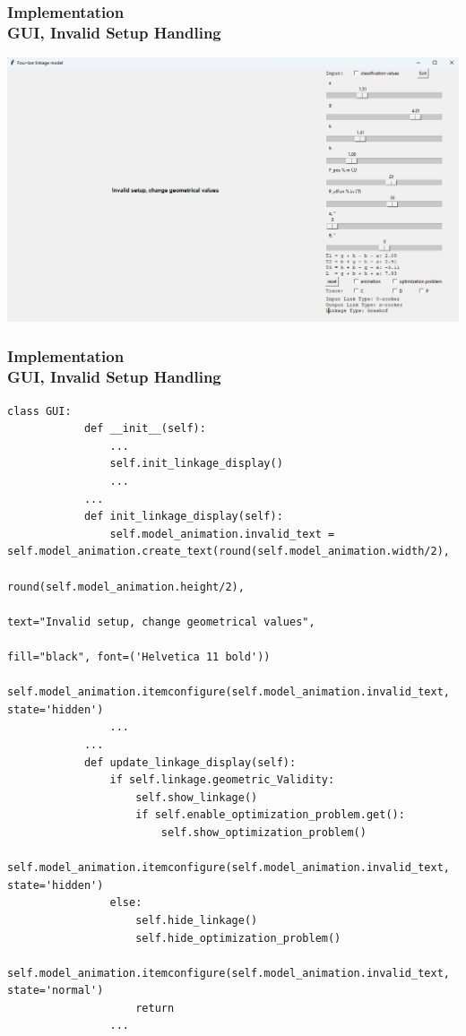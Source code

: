 \documentclass[ucs,10pt]{beamer}
\begin{document}
\begin{frame}[fragile]
\frametitle{Implementation \\
	\small \color{rwth-blue} GUI, Invalid Setup Handling}
	\begin{center}
		\includegraphics[width=\linewidth]{./Figures/Implementation/invalid_setup.png}
	\end{center}
\end{frame}

\begin{frame}[fragile]
\frametitle{Implementation \\
	\small \color{rwth-blue} GUI, Invalid Setup Handling}
	\begin{lstlisting}[basicstyle=\ssmall]
		class GUI:
			def __init__(self):
				...
				self.init_linkage_display()
				...
			...
			def init_linkage_display(self):
				self.model_animation.invalid_text = self.model_animation.create_text(round(self.model_animation.width/2),
				                                                              round(self.model_animation.height/2),
				                                                              text="Invalid setup, change geometrical values",
				                                                              fill="black", font=('Helvetica 11 bold'))
				self.model_animation.itemconfigure(self.model_animation.invalid_text, state='hidden')
				...
			...
			def update_linkage_display(self):
				if self.linkage.geometric_Validity:
					self.show_linkage()
					if self.enable_optimization_problem.get():
						self.show_optimization_problem()
					self.model_animation.itemconfigure(self.model_animation.invalid_text, state='hidden')
				else:
					self.hide_linkage()
					self.hide_optimization_problem()
					self.model_animation.itemconfigure(self.model_animation.invalid_text, state='normal')
					return
				...
	\end{lstlisting}
\end{frame}
\end{document}
